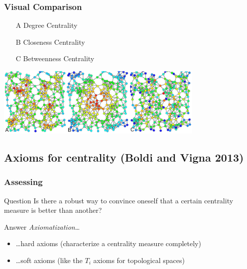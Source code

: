 \begin{frame}
  \frametitle{Visual Comparison}
  \begin{itemize}
    \item[A] Degree Centrality
    \item[B] Closeness Centrality
    \item[C] Betweenness Centrality
  \end{itemize}
  \centering
  \includegraphics[width=100mm]{imgs/centrality.pdf}
\end{frame}

\subsection{Axioms for centrality (Boldi and Vigna 2013)}

\begin{frame}
  \frametitle{Assessing}
  \begin{block}{Question}
    Is there a robust way to convince oneself that a certain centrality measure
    is better than another?
  \end{block}
  \pause
  \begin{block}{Answer}
    \emph{Axiomatization}\dots
    \begin{itemize}
      \pause
      \item \dots hard axioms (characterize a centrality measure completely)
      \pause
      \item \dots soft axioms (like the $T_i$ axioms for topological spaces)
    \end{itemize}
  \end{block}
\end{frame}

